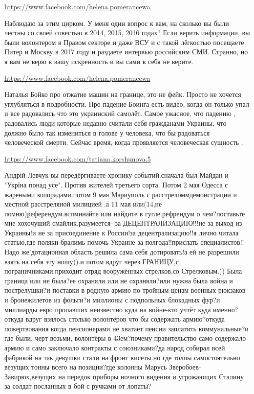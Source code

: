 \documentclass[a4paper,11pt]{extreport}
\begin{document}
\begin{itemize}
\begin{itemize}
\end{itemize}
\url{https://www.facebook.com/helena.pomerancewa}

Наблюдаю за этим цирком.
У меня один вопрос к вам, на сколько вы были честны со своей совестью в 2014, 2015, 2016 годах? Если верить информации, вы были волонтером в Правом секторе и даже ВСУ и с такой лёгкостью посещаете Питер и Москву в 2017 году и раздаете интервью российским СМИ. Странно, но я вам не верю в вашу искренность и вы сами в себя не верите.

\begin{itemize}
\url{https://www.facebook.com/helena.pomerancewa}

Наталья Бойко про отжатие машин на границе, это не фейк. Просто не хочется углубляться в подробности. Про падение Боинга есть видео, когда он только упал и все радовались что это украинский самолёт. Самое ужасное, что падению , радовались люди которые недавно считали себя гражданами Украины, что должно было так измениться в голове у человека, что бы радоваться человеческой смерти.
Сейчас время, когда проявляется человеческая сущность .

\url{https://www.facebook.com/tatiana.korshunova.5}

Андрій Левчук вы передёргиваете хронику событий.сначала был Майдан и "Укрїна понад усе". Против жителей третьего сорта. Потом 2 мая Одесса с жареными колорадами.потом 9 мая Мариуполь с расстреломмдемонстрации и местной расстреляной милицией .а 11 мая или(14,не помню)референдум.вспминайте или найдите в гугле.рефрендум о чем?поставьте мне хохочуший смайлик,разумеется- за ДЕЦЕНТРАЛИЗАЦИЮ!!!не за выход из Украины!и не за присоединение к России!за децентрализацию!!я лично читала статью,где поляки бралимь помочь Украине за полгода!!прислать специалистов!! Надо же'дотационная область решила сама себя дотировать!а ей не разрешили взять на себя эту ношу)).и потом вдруг через ГРАНИЦУ,с пограничниками.приходит отряд вооружённых стрелков.со Стрелковым.)) Была граница или не была?ее охраняли или не охраняли?или нужна была война и пострелушки?и поставки в родную армию по тройным ценам военных рюкзаков и бронежилетов из фольги?и миллионы с подпольных блокадных фур?и миллиарды евро пропавших неизвестно куда на войне-кто учтёт куда именно?откуда вдруг взялось столько волонтёров что бы содержать армию?откуда пожертвования когда пенсионерами не хватает пенсии заплатить коммунальные?и где были, черт возьми, волонтёры в 43ем?почему правительство само содержало армию и само заключало контракты с союзниками?да народ собирал всей фабрикой на так девушки стали на фронт кисеты.но где толпы самостоятельно везущих тонны всего на позиции?где колонны Марусь Зверобоев-Завирюх,везущих на передок приборы ночного видения и угрожающих Сталину за солдат посланных в бой с ручками от лопаты?


\end{itemize}
\end{itemize}
\end{document}
